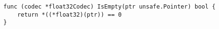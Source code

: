 \begin{lstlisting}[language=Golang, label=lst:labels-classexample-conversion-struct-basic, caption=Usage class example: conversion-struct-basic]
func (codec *float32Codec) IsEmpty(ptr unsafe.Pointer) bool {
    return *((*float32)(ptr)) == 0
}
\end{lstlisting}